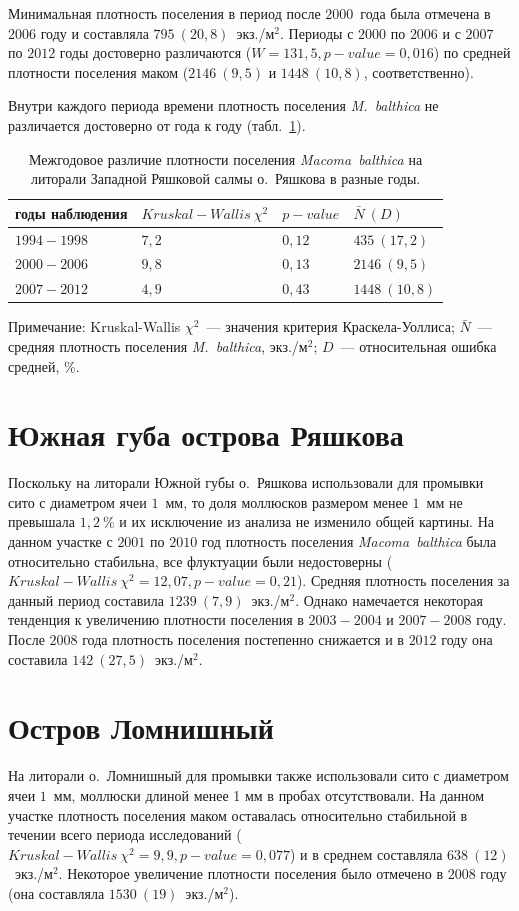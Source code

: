 Минимальная плотность поселения в период после $2000$~года была отмечена в $2006$ году и составляла $795~(20,8)$~экз./м$^2$. 
Периоды с $2000$ по $2006$ и с $2007$ по $2012$ годы достоверно различаются ($W = 131,5, p-value = 0,016$) по средней плотности поселения маком ($2146~(9,5)$ и $1448~(10,8)$, соответственно).

Внутри каждого периода времени плотность поселения {\it M.~balthica} не различается достоверно от года к году (табл.~\ref{tab:ZRS_N2_Kruskal}).

	\begin{table}[p]
	\caption{Межгодовое различие плотности поселения {\it Macoma~balthica} на литорали Западной Ряшковой салмы о.~Ряшкова в разные годы.}
	\label{tab:ZRS_N2_Kruskal}
	\begin{tabularx}{\textwidth}{|*{4}{X|}} \hline
	годы наблюдения & $Kruskal-Wallis\ \chi^2$ & $p-value$ & $\bar{N} ~ (D)$ \\ 
	\hline
	$1994 - 1998$ & $7,2$ & $0,12$ & $435~(17,2)$ \\
	\hline
	$2000 - 2006$ & $9,8$ & $0,13$ & $2146~(9,5)$\\
	\hline
	$2007 - 2012$ & $4,9$ & $0,43$ & $1448~(10,8)$ \\
	\hline
	\end{tabularx}
	{\footnotesize Примечание: Kruskal-Wallis $\chi^2$~--- значения критерия Краскела-Уоллиса; $\bar{N}$~--- средняя плотность поселения {\it M.~balthica}, экз./м$^2$; $D$~--- относительная ошибка средней, \%.}
	\end{table}


		\section{Южная губа острова Ряшкова}
Поскольку на литорали Южной губы о.~Ряшкова использовали для промывки сито с диаметром ячеи $1$~мм, то доля моллюсков размером менее $1$~мм не превышала $1,2~\%$ и их исключение из анализа не изменило общей картины.
На данном участке с $2001$ по $2010$ год плотность поселения {\it Macoma~balthica} была относительно стабильна, все флуктуации были недостоверны ($Kruskal-Wallis\ \chi^2 = 12,07, p-value = 0,21$). 
Средняя плотность поселения за данный период составила $1239~(7,9)$~экз./м$^2$.
Однако намечается некоторая тенденция к увеличению плотности поселения в $2003-2004$ и $2007-2008$ году.
После $2008$ года плотность поселения постепенно снижается и в $2012$ году она составила $142~(27,5)$~экз./м$^2$.

		\section{Остров Ломнишный}
На литорали о.~Ломнишный для промывки также использовали сито с диаметром ячеи $1$~мм, моллюски длиной менее 1 мм в пробах отсутствовали.
На данном участке плотность поселения маком оставалась относительно стабильной в течении всего периода исследований ($Kruskal-Wallis\ \chi^2 = 9,9, p-value = 0,077$) и в среднем составляла $638~(12)$~экз./м$^2$.
Некоторое увеличение плотности поселения было отмечено в $2008$ году (она составляла $1530~(19)$~экз./м$^2$).

